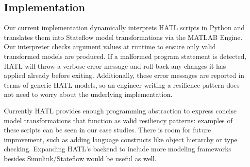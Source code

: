 \subsection{Implementation}

Our current implementation dynamically interprets HATL scripts in
Python and translates them into Stateflow model transformations via
the MATLAB Engine. Our interpreter checks argument values at runtime
to ensure only valid transformed models are produced. If a malformed
program statement is detected, HATL will throw a verbose error message
and roll back any changes it has applied already before
exiting. Additionally, these error messages are reported in terms of
generic HATL models, so an engineer writing a resilience pattern does
not need to worry about the underlying implementation.

Currently HATL provides enough programming abstraction to express
concise model transformations that function as valid resiliency
patterns: examples of these scripts can be seen in our case
studies. There is room for future improvement, such as adding language
constructs like object hierarchy or type checking. Expanding HATL's
backend to include more modeling frameworks besides Simulink/Stateflow
would be useful as well.
